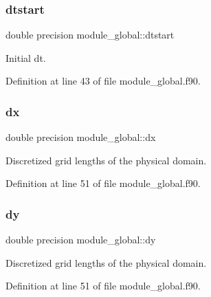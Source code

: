 \mbox{\label{namespacemodule__global_a5d6f695d6a4af07b0334c3b4e609a527}} 
\subsubsection{\texorpdfstring{dtstart}{dtstart}}
{\footnotesize\ttfamily double precision module\+\_\+global\+::dtstart}



Initial dt. 



Definition at line 43 of file module\+\_\+global.\+f90.

\mbox{\label{namespacemodule__global_ac9f59881b3d1a132a79c38005a3327b0}} 
\subsubsection{\texorpdfstring{dx}{dx}}
{\footnotesize\ttfamily double precision module\+\_\+global\+::dx}



Discretized grid lengths of the physical domain. 



Definition at line 51 of file module\+\_\+global.\+f90.

\mbox{\label{namespacemodule__global_ad57f0245662462006b209450d8d16e06}} 
\subsubsection{\texorpdfstring{dy}{dy}}
{\footnotesize\ttfamily double precision module\+\_\+global\+::dy}



Discretized grid lengths of the physical domain. 



Definition at line 51 of file module\+\_\+global.\+f90.

\mbox{\label{namespacemodule__global_ac6cde152bc0a2bd48b727bfe326c68ff}} 
